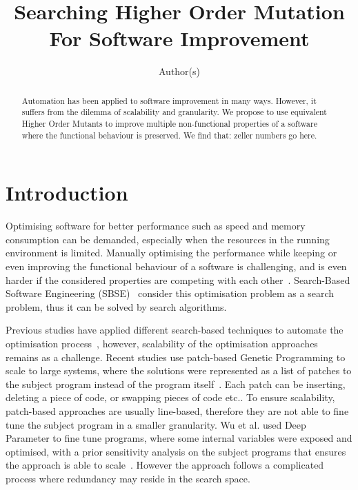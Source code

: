 \documentclass[oribibl]{llncs}
\begin{document}
\title{Searching Higher Order Mutation For Software Improvement}

\author{Author(s)
}



\maketitle

\begin{abstract}
Automation has been applied to software improvement in many ways.
However, it suffers from the dilemma of scalability and granularity.
We propose to use equivalent Higher Order Mutants to improve multiple non-functional properties of a software where the functional behaviour is preserved.
We find that: zeller numbers go here.
\end{abstract}

\section{Introduction}
\label{sec_intro}

Optimising software for better performance such as speed and memory consumption can be demanded, especially when the resources in the running environment is limited.
Manually optimising the performance while keeping or even improving the functional behaviour of a software is challenging, 
and is even harder if the considered properties are competing with each other~\cite{Harman:2012:GCC:2351676.2351678}.
Search-Based Software Engineering (SBSE)~\cite{Harman2001833} consider this optimisation problem as a search problem, thus it can be solved by search algorithms.

Previous studies have applied different search-based techniques to automate the optimisation process~\cite{arcuri-ssbse-2011, 6035728,Brake:2008:ADS:1370018.1370031,hutter2009paramils}, however, scalability of the optimisation approaches remains as a challenge.
Recent studies use patch-based Genetic Programming to scale to large systems, where the solutions were represented as a list of patches to the subject program instead of the program itself~\cite{Bruce:2015:REC:2739480.2754752,geneticimprovementJP}.
Each patch can be inserting, deleting a piece of code, or swapping pieces of code etc..
To ensure scalability, patch-based approaches are usually line-based, therefore they are not able to fine tune the subject program in a smaller granularity. 
Wu et al. used Deep Parameter to fine tune programs, where some internal variables were exposed and optimised, with a prior sensitivity analysis on the subject programs that ensures the approach is able to scale~\cite{Wu:2015:DPO:2739480.2754648}.
However the approach follows a complicated process where redundancy may reside in the search space.
\end{document}
